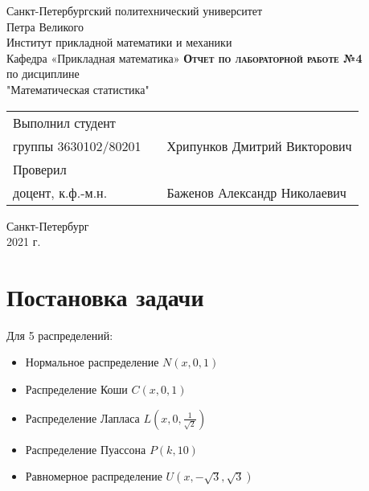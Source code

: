 \documentclass[12pt,a4paper]{article}
\begin{document}
    \begin{titlepage}
        \begin{center}
            \large
            Санкт-Петербургский политехнический университет\\Петра Великого\\
            \vspace{0.5cm}
            Институт прикладной математики и механики\\
            \vspace{0.25cm}
            Кафедра «Прикладная математика»
            \vfill
            \textsc{\LARGE\textbf{Отчет по лабораторной работе №4}}\\[5mm]
            \Large
            по дисциплине\\"Математическая статистика"
        \end{center}
        \vfill
        \begin{tabular}{l p{175pt} l}
            Выполнил студент \\ группы 3630102/80201 && Хрипунков Дмитрий Викторович
            \vspace{0.25cm}
            \\Проверил \\ доцент, к.ф.-м.н. && Баженов Александр Николаевич
        \end{tabular}
        \vfill
        \begin{center}
            Санкт-Петербург \\ 2021 г.
        \end{center}
    \end{titlepage}
    
\newpage
\begin{center}
    \tableofcontents
    \setcounter{page}{2}
\end{center}
\newpage
\begin{center}
    \listoffigures
\end{center}

\newpage
\section{Постановка задачи}
Для 5 распределений:
\begin{itemize}
    \item Нормальное распределение $N(x,0,1)$
    \item Распределение Коши $C(x,0,1)$
    \item Распределение Лапласа $L(x,0,\frac{1}{\sqrt{2}})$
    \item Распределение Пуассона $P(k,10)$
    \item Равномерное распределение $U(x,-\sqrt{3},\sqrt{3})$
\end{itemize}
\end{document}
